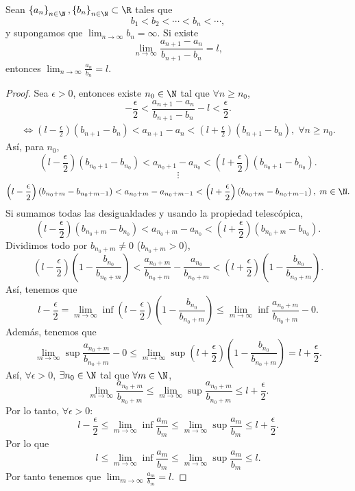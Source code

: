 \begin{ftheorem}
	\normalfont Sean $\displaystyle \left\{ a_{n}\right\} _{n\in\N}, \left\{ b_{n}\right\} _{n\in\N}\subset \R $ tales que 
	\[b_{1} < b_{2} < \cdots < b_{n} < \cdots  ,\]
	y supongamos que $\displaystyle \lim_{n \to \infty}b_{n}= \infty $. Si existe 
	\[\lim_{n \to \infty}\frac{a_{n+1}-a_{n}}{b_{n+1}-b_{n}} = l , \]
	entonces $\displaystyle \lim_{n \to \infty}\frac{a_{n}}{b_{n}} = l $.
\end{ftheorem}

\begin{proof}
Sea $\displaystyle \epsilon > 0 $, entonces existe $\displaystyle n_{0} \in \N $ tal que $\displaystyle \forall n \geq n_{0} $, 
\[ -\frac{\epsilon }{2} < \frac{a_{n+1}-a_{n}}{b_{n+1}-b_{n}} - l < \frac{\epsilon }{2} .\]
\[
\begin{split}
 \iff\left(l  - \frac{\epsilon }{2}\right)\left(b_{n+1}-b_{n}\right) < a_{n+1}-a_{n} < \left(l + \frac{\epsilon }{2}\right)\left(b_{n+1}-b_{n}\right), \; \forall n\geq n_{0}.
\end{split}
\]
Así, para $\displaystyle n_{0} $,
\[\left(l  - \frac{\epsilon }{2}\right)\left(b_{n_{0}+1}-b_{n_{0}}\right) < a_{n_{0}+1}-a_{n_{0}} < \left(l + \frac{\epsilon }{2}\right)\left(b_{n_{0}+1}-b_{n_{0}}\right) .\]
\[\vdots \]
\[\left(l-\frac{\epsilon }{2}\right)\left(b_{n_{0}+m}-b_{n_{0}+m -1}\right) < a_{n_{0}+m} - a_{n_{0}+m -1}<\left(l+\frac{\epsilon }{2}\right)\left(b_{n_{0}+m}-b_{n_{0}+m -1}\right), \; m \in \N .\]
Si sumamos todas las desigualdades y usando la propiedad telescópica, 
\[\left(l - \frac{\epsilon }{2}\right)\left(b_{n_{0}+m}-b_{n_{0}}\right) < a_{n_{0}+m} - a_{n_{0}}< \left(l + \frac{\epsilon }{2}\right)\left(b_{n_{0}+m}-b_{n_{0}}\right) .\]
Dividimos todo por $\displaystyle b_{n_{0}+m} \neq 0 $ ($\displaystyle b_{n_{0}+m} > 0 $), 
\[ \left(l-\frac{\epsilon }{2}\right)\left(1-\frac{b_{n_{0}}}{b_{n_{0}+m}}\right) < \frac{a_{n_{0}+m}}{b_{n_{0}+m}}-\frac{a_{n_{0}}}{b_{n_{0}+m}}<\left(l+\frac{\epsilon }{2}\right)\left(1 - \frac{b_{n_{0}}}{b_{n_{0}+m}}\right).\]
Así, tenemos que 
\[l - \frac{\epsilon }{2} = \lim_{m \to \infty}\inf\left(l-\frac{\epsilon }{2}\right)\left(1 - \frac{b_{n_{0}}}{b_{n_{0}+m}}\right) \leq \lim_{m \to \infty}\inf \frac{a_{n_{0}+m}}{b_{n_{0}+m}} - 0.\]
Además, tenemos que 
\[\lim_{m \to \infty}\sup \frac{a_{n_{0}+m}}{b_{n_{0}+m}} - 0 \leq \lim_{m \to \infty}\sup\left(l+\frac{\epsilon }{2}\right)\left(1-\frac{b_{n_{0}}}{b_{n_{0}+m}}\right) = l + \frac{\epsilon }{2} .\]
Así, $\displaystyle \forall \epsilon > 0 $, $\displaystyle \exists n_{0} \in \N $ tal que $\displaystyle \forall m \in \N $, 
\[\lim_{m \to \infty}\frac{a_{n_{0}+m}}{b_{n_{0}+m}} \leq \lim_{m \to \infty}\sup\frac{a_{n_{0}+m}}{b_{n_{0}+m}} \leq l + \frac{\epsilon }{2} .\]
Por lo tanto, $\displaystyle \forall \epsilon > 0 $:
\[l - \frac{\epsilon }{2} \leq \lim_{m \to \infty}\inf \frac{a_{m}}{b_{m}} \leq \lim_{m \to \infty}\sup \frac{a_{m}}{b_{m}} \leq l + \frac{\epsilon }{2}.\]
Por lo que
\[l \leq \lim_{m \to \infty}\inf \frac{a_{m}}{b_{m}} \leq \lim_{m \to \infty}\sup \frac{a_{m}}{b_{m}} \leq l .\]
Por tanto tenemos que $\displaystyle \lim_{m \to \infty}\frac{a_{m}}{b_{m}} = l $.
\end{proof}

